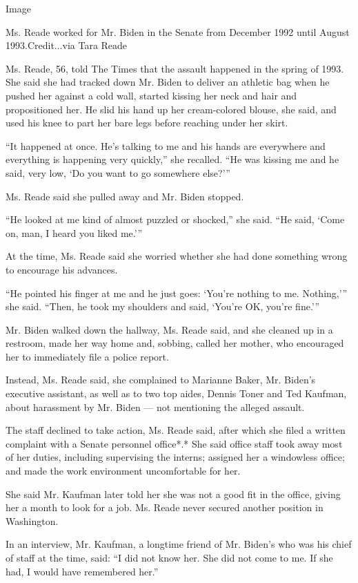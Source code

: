 Image

Ms. Reade worked for Mr. Biden in the Senate from December 1992 until
August 1993.Credit...via Tara Reade

Ms. Reade, 56, told The Times that the assault happened in the spring of
1993. She said she had tracked down Mr. Biden to deliver an athletic bag
when he pushed her against a cold wall, started kissing her neck and
hair and propositioned her. He slid his hand up her cream-colored
blouse, she said, and used his knee to part her bare legs before
reaching under her skirt.

``It happened at once. He's talking to me and his hands are everywhere
and everything is happening very quickly,'' she recalled. ``He was
kissing me and he said, very low, `Do you want to go somewhere else?'''

Ms. Reade said she pulled away and Mr. Biden stopped.

``He looked at me kind of almost puzzled or shocked,'' she said. ``He
said, `Come on, man, I heard you liked me.'''

At the time, Ms. Reade said she worried whether she had done something
wrong to encourage his advances.

``He pointed his finger at me and he just goes: `You're nothing to me.
Nothing,''' she said. ``Then, he took my shoulders and said, `You're OK,
you're fine.'''

Mr. Biden walked down the hallway, Ms. Reade said, and she cleaned up in
a restroom, made her way home and, sobbing, called her mother, who
encouraged her to immediately file a police report.

Instead, Ms. Reade said, she complained to Marianne Baker, Mr. Biden's
executive assistant, as well as to two top aides, Dennis Toner and Ted
Kaufman, about harassment by Mr. Biden --- not mentioning the alleged
assault.

The staff declined to take action, Ms. Reade said, after which she filed
a written complaint with a Senate personnel office*.* She said office
staff took away most of her duties, including supervising the interns;
assigned her a windowless office; and made the work environment
uncomfortable for her.

She said Mr. Kaufman later told her she was not a good fit in the
office, giving her a month to look for a job. Ms. Reade never secured
another position in Washington.

In an interview, Mr. Kaufman, a longtime friend of Mr. Biden's who was
his chief of staff at the time, said: ``I did not know her. She did not
come to me. If she had, I would have remembered her.''


